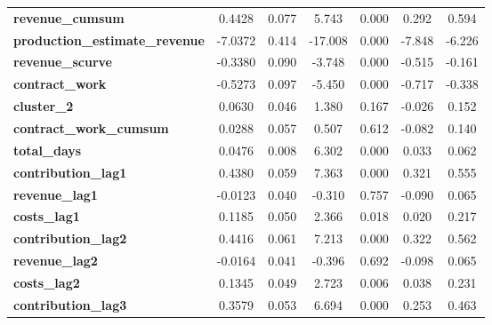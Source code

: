 \begin{center}
\begin{tabular}{lcccccc}
\textbf{revenue\_cumsum}                    &       0.4428  &        0.077     &     5.743  &         0.000        &        0.292    &        0.594     \\
\textbf{production\_estimate\_revenue}      &      -7.0372  &        0.414     &   -17.008  &         0.000        &       -7.848    &       -6.226     \\
\textbf{revenue\_scurve}                    &      -0.3380  &        0.090     &    -3.748  &         0.000        &       -0.515    &       -0.161     \\
\textbf{contract\_work}                     &      -0.5273  &        0.097     &    -5.450  &         0.000        &       -0.717    &       -0.338     \\
\textbf{cluster\_2}                         &       0.0630  &        0.046     &     1.380  &         0.167        &       -0.026    &        0.152     \\
\textbf{contract\_work\_cumsum}             &       0.0288  &        0.057     &     0.507  &         0.612        &       -0.082    &        0.140     \\
\textbf{total\_days}                        &       0.0476  &        0.008     &     6.302  &         0.000        &        0.033    &        0.062     \\
\textbf{contribution\_lag1}                 &       0.4380  &        0.059     &     7.363  &         0.000        &        0.321    &        0.555     \\
\textbf{revenue\_lag1}                      &      -0.0123  &        0.040     &    -0.310  &         0.757        &       -0.090    &        0.065     \\
\textbf{costs\_lag1}                        &       0.1185  &        0.050     &     2.366  &         0.018        &        0.020    &        0.217     \\
\textbf{contribution\_lag2}                 &       0.4416  &        0.061     &     7.213  &         0.000        &        0.322    &        0.562     \\
\textbf{revenue\_lag2}                      &      -0.0164  &        0.041     &    -0.396  &         0.692        &       -0.098    &        0.065     \\
\textbf{costs\_lag2}                        &       0.1345  &        0.049     &     2.723  &         0.006        &        0.038    &        0.231     \\
\textbf{contribution\_lag3}                 &       0.3579  &        0.053     &     6.694  &         0.000        &        0.253    &        0.463     \\

\end{tabular}
\end{center}
